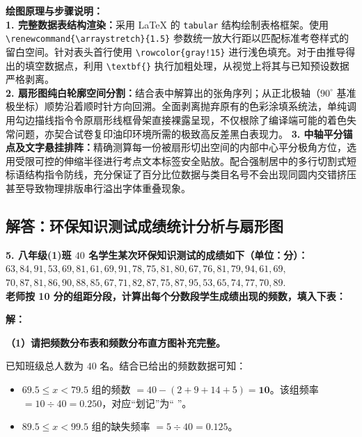 \vspace{0.6cm}

{\small\color{blue!70!black}
\textbf{绘图原理与步骤说明：}\\
\textbf{1. 完整数据表结构渲染：}采用 LaTeX 的 \texttt{tabular} 结构绘制表格框架。使用 \texttt{\textbackslash renewcommand\{\textbackslash arraystretch\}\{1.5\}} 参数统一放大行距以匹配标准考卷样式的留白空间。针对表头首行使用 \texttt{\textbackslash rowcolor\{gray!15\}} 进行浅色填充。对于由推导得出的填空数据点，利用 \texttt{\textbackslash textbf\{\}} 执行加粗处理，从视觉上将其与已知预设数据严格剥离。\\
\textbf{2. 扇形图纯白轮廓空间分割：}结合表中解算出的张角序列；从正北极轴（$90^\circ$ 基准极坐标）顺势沿着顺时针方向回溯。全面剥离抛弃原有的色彩涂填系统法，单纯调用勾边描线指令令原扇形线框骨架直接裸露呈现，不仅根除了编译端可能的着色失常问题，亦契合试卷复印油印环境所需的极致高反差黑白表现力。
\textbf{3. 中轴平分锚点及文字悬挂排阵：}精确测算每一份被扇形切出空间的内部中心平分极角方位，选用受限可控的伸缩半径进行考点文本标签安全贴放。配合强制居中的多行切割式短标语结构指令防线，充分保证了百分比位数据与类目名号不会出现同圆内交错挤压甚至导致物理排版串行溢出字体重叠现象。
}

\newpage

\newpage

\subsection{解答：环保知识测试成绩统计分析与扇形图}

\vspace{0.6cm}

\textbf{5. 八年级(1)班 $40$ 名学生某次环保知识测试的成绩如下（单位：分）：\\
$63, 84, 91, 53, 69, 81, 61, 69, 91, 78, 75, 81, 80, 67, 76, 81, 79, 94, 61, 69,$ \\
$70, 87, 81, 86, 90, 88, 85, 67, 71, 82, 87, 75, 87, 95, 53, 65, 74, 77, 70, 89.$ \\
老师按 10 分的组距分段，计算出每个分数段学生成绩出现的频数，填入下表：}

\vspace{0.4cm}

\textbf{解：}

\textbf{（1）请把频数分布表和频数分布直方图补充完整。}

\vspace{0.2cm}
已知班级总人数为 $40$ 名。结合已给出的频数数据可知：
\begin{itemize}
  \item $69.5 \leqslant x < 79.5$ 组的频数 $= 40 - (2 + 9 + 14 + 5) = \boldsymbol{10}$。该组频率 $= 10 \div 40 = \boldsymbol{0.250}$，对应“划记”为“\zhengV{} \zhengV{}”。
  \item $89.5 \leqslant x < 99.5$ 组的缺失频率 $= 5 \div 40 = \boldsymbol{0.125}$。
\end{itemize}

